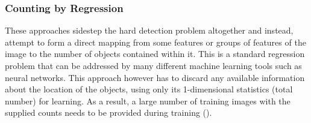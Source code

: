 \subsubsection{Counting by Regression}
These approaches sidestep the hard detection problem altogether and instead, attempt to form a direct mapping from some features or groups of features of the image to the number of objects contained within it. This is a standard regression problem that can be addressed by many different machine learning tools such as neural networks. This approach however has to discard any available information about the location of the objects, using only its 1-dimensional statistics (total number) for learning. As a result, a large number of training images with the supplied counts needs to be provided during training (\cite{REF18}).


\bigskip

\goodbreak
